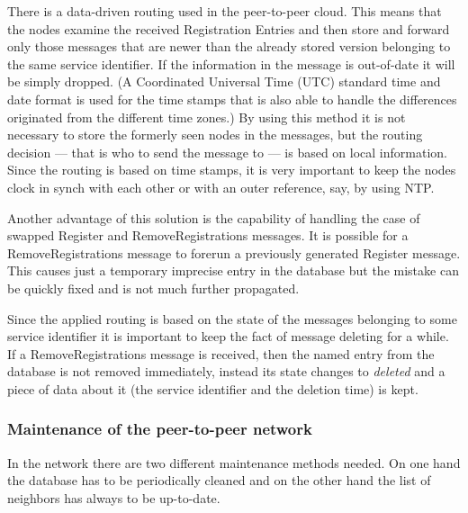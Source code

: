 \documentclass{book}
\begin{document}
There is a data-driven routing used in the peer-to-peer cloud. This means that the nodes examine the received Registration Entries and then store and forward only those messages that are newer than the already stored version belonging to the same service identifier. If the information in the message is out-of-date it will be simply dropped. (A Coordinated Universal Time (UTC) standard time and date format is used for the time stamps that is also able to handle the differences originated from the different time zones.) By using this method it is not necessary to store the formerly seen nodes in the messages, but the routing decision --- that is who to send the message to --- is based on local information. Since the routing is based on time stamps, it is very important to keep the nodes clock in synch with each other or with an outer reference, say, by using NTP.

Another advantage of this solution is the capability of handling the case of swapped Register and RemoveRegistrations messages. It is possible for a RemoveRegistrations message to forerun a previously generated Register message. This causes just a temporary imprecise entry in the database but the mistake can be quickly fixed and is not much further propagated.

Since the applied routing is based on the state of the messages belonging to some service identifier it is important to keep the fact of message deleting for a while. If a RemoveRegistrations message is received, then the named entry from the database is not removed immediately, instead its state changes to {\it deleted} and a piece of data about it (the service identifier and the deletion time) is kept.

\subsubsection{Maintenance of the peer-to-peer network}
In the network there are two different maintenance methods needed. On one hand the database has to be periodically cleaned and on the other hand the list of neighbors has always to be up-to-date.
\end{document}
